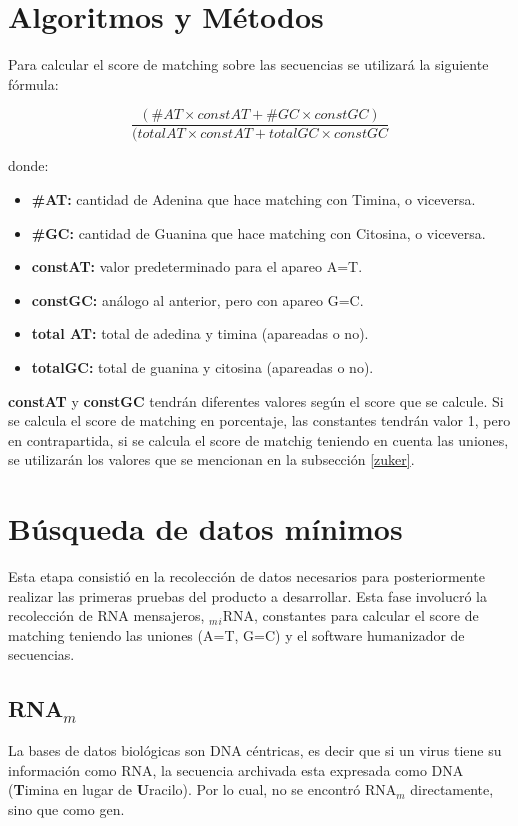 \documentclass[12pt,a4paper,spanish]{article}
\begin{document}
\section{Algoritmos y Métodos}
	\par Para calcular el score de matching sobre las secuencias se utilizará la siguiente fórmula:

		\begin{equation}	
			\frac{(\#AT \times constAT + \#GC \times constGC)}{(totalAT \times constAT + totalGC \times constGC}
		\end{equation}	

		\par donde:
		\begin{itemize}
			\item \textbf{\#AT:} cantidad de Adenina que hace matching con Timina, o viceversa.
			\item \textbf{\#GC:} cantidad de Guanina que hace matching con Citosina, o viceversa.
			\item \textbf{constAT:} valor predeterminado para el apareo A=T.
			\item \textbf{constGC:} análogo al anterior, pero con apareo G=C.
			\item \textbf{total AT:} total de adedina y timina (apareadas o no).
			\item \textbf{totalGC:} total de guanina y citosina (apareadas o no).	
		\end{itemize}

	\par \textbf{constAT} y \textbf{constGC} tendrán diferentes valores según el score que se calcule. Si se calcula el 	score de matching en porcentaje, las constantes tendrán valor 1, pero en contrapartida, si se calcula el score de 		matchig teniendo en cuenta las uniones, se utilizarán los valores que se mencionan en la subsección \ref{zuker}.
\section{Búsqueda de datos mínimos}
	\par Esta etapa consistió en la recolección de datos necesarios para posteriormente realizar las primeras pruebas del 		producto a desarrollar. Esta fase involucró la recolección de RNA mensajeros, $_m$$_i$RNA, constantes para calcular el 		score de matching teniendo las uniones (A=T, G=C) y el software humanizador de secuencias.

	\subsection{RNA$_m$}
		\par La bases de datos biológicas son DNA céntricas, es decir que si un virus tiene su información como RNA, la 		secuencia archivada esta expresada como DNA (\textbf{T}imina en lugar de \textbf{U}racilo). Por lo cual, no se 			encontró RNA$_m$ directamente, sino que como gen.
\end{document}
